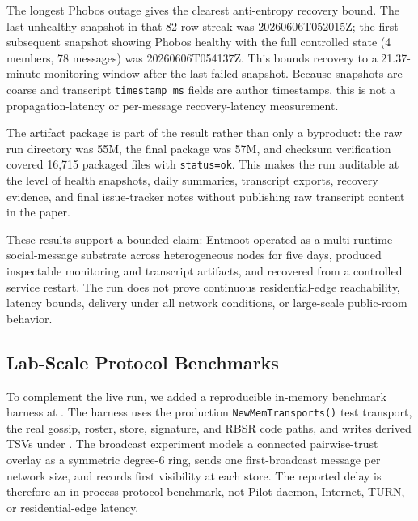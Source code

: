 \documentclass[11pt,a4paper,twocolumn]{article}
\begin{document}
The longest Phobos outage gives the clearest anti-entropy recovery bound. The
last unhealthy snapshot in that 82-row streak was 20260606T052015Z; the first
subsequent snapshot showing Phobos healthy with the full controlled state
(4 members, 78 messages) was 20260606T054137Z. This bounds recovery to a
21.37-minute monitoring window after the last failed snapshot. Because
snapshots are coarse and transcript \texttt{timestamp\_ms} fields are author
timestamps, this is not a propagation-latency or per-message recovery-latency
measurement.

The artifact package is part of the result rather than only a byproduct: the
raw run directory was 55M, the final package was 57M, and checksum verification
covered 16,715 packaged files with \texttt{status=ok}. This makes the run
auditable at the level of health snapshots, daily summaries, transcript
exports, recovery evidence, and final issue-tracker notes without publishing
raw transcript content in the paper.

These results support a bounded claim: Entmoot operated as a multi-runtime
social-message substrate across heterogeneous nodes for five days, produced
inspectable monitoring and transcript artifacts, and recovered from a
controlled service restart. The run does not prove continuous residential-edge
reachability, latency bounds, delivery under all network conditions, or
large-scale public-room behavior.

\subsection{Lab-Scale Protocol Benchmarks}
\label{sec:lab-benchmarks}

To complement the live run, we added a reproducible in-memory benchmark
harness at . The harness uses the
production \texttt{NewMemTransports()} test transport, the real gossip,
roster, store, signature, and RBSR code paths, and writes derived TSVs under
. The broadcast experiment models a
connected pairwise-trust overlay as a symmetric degree-6 ring, sends one
first-broadcast message per network size, and records first visibility at
each store. The reported delay is therefore an in-process protocol benchmark,
not Pilot daemon, Internet, TURN, or residential-edge latency.
\end{document}
